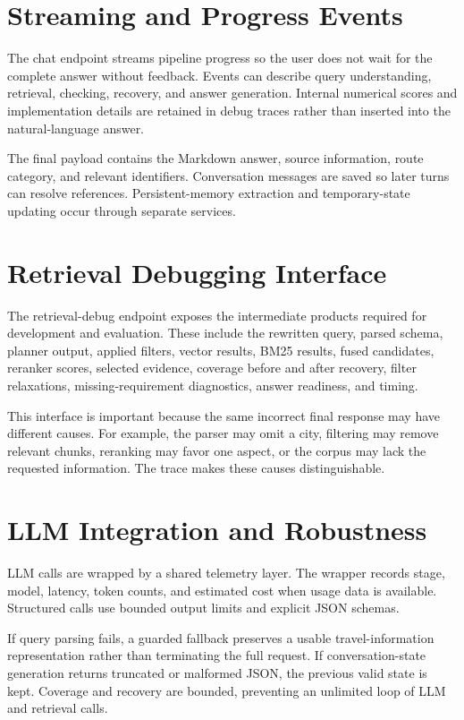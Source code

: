 \section{Streaming and Progress Events}

The chat endpoint streams pipeline progress so the user does not wait for the
complete answer without feedback. Events can describe query understanding,
retrieval, checking, recovery, and answer generation. Internal numerical scores
and implementation details are retained in debug traces rather than inserted
into the natural-language answer.

The final payload contains the Markdown answer, source information, route
category, and relevant identifiers. Conversation messages are saved so later
turns can resolve references. Persistent-memory extraction and temporary-state
updating occur through separate services.

\section{Retrieval Debugging Interface}

The retrieval-debug endpoint exposes the intermediate products required for
development and evaluation. These include the rewritten query, parsed schema,
planner output, applied filters, vector results, BM25 results, fused candidates,
reranker scores, selected evidence, coverage before and after recovery, filter
relaxations, missing-requirement diagnostics, answer readiness, and timing.

This interface is important because the same incorrect final response may have
different causes. For example, the parser may omit a city, filtering may remove
relevant chunks, reranking may favor one aspect, or the corpus may lack the
requested information. The trace makes these causes distinguishable.

\section{LLM Integration and Robustness}

LLM calls are wrapped by a shared telemetry layer. The wrapper records stage,
model, latency, token counts, and estimated cost when usage data is available.
Structured calls use bounded output limits and explicit JSON schemas.

If query parsing fails, a guarded fallback preserves a usable travel-information
representation rather than terminating the full request. If conversation-state
generation returns truncated or malformed JSON, the previous valid state is
kept. Coverage and recovery are bounded, preventing an unlimited loop of LLM
and retrieval calls.

